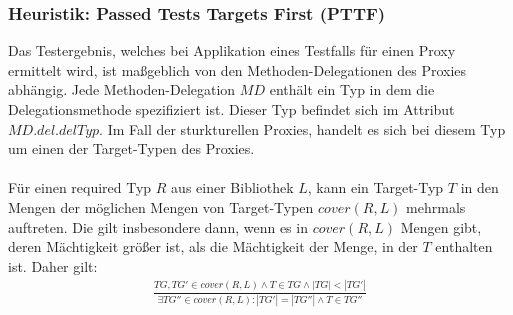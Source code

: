 \documentclass[a4paper,12pt]{article}
\begin{document}
\subsubsection{Heuristik: Passed Tests Targets First (PTTF)}
Das Testergebnis, welches bei Applikation eines Testfalls für einen Proxy ermittelt wird, ist maßgeblich von den Methoden-Delegationen des Proxies abhängig. Jede Methoden-Delegation $\mathit{MD}$ enthält ein Typ in dem die Delegationsmethode spezifiziert ist. Dieser Typ befindet sich im Attribut $\mathit{MD.del.delTyp}$. Im Fall der sturkturellen Proxies, handelt es sich bei diesem Typ um einen der Target-Typen des Proxies.\\\\
Für einen required Typ $R$ aus einer Bibliothek $L$, kann ein Target-Typ $T$ in den Mengen der möglichen Mengen von Target-Typen $\mathit{cover(R,L)}$ mehrmals auftreten. Die gilt insbesondere dann, wenn es in $\mathit{cover(R,L)}$ Mengen gibt, deren Mächtigkeit größer ist, als die Mächtigkeit der Menge, in der $T$ enthalten ist. Daher gilt:
\begin{gather*}
\frac{\mathit{TG},\mathit{TG'} \in \mathit{cover(R,L)} \wedge T \in \mathit{TG} \wedge |\mathit{TG}| < |\mathit{TG'}|}{\exists \mathit{TG''} \in \mathit{cover(R,L)} : |\mathit{TG'}| = |\mathit{TG''}| \wedge T \in \mathit{TG''}}
\end{gather*}
\noindent
\end{document}
